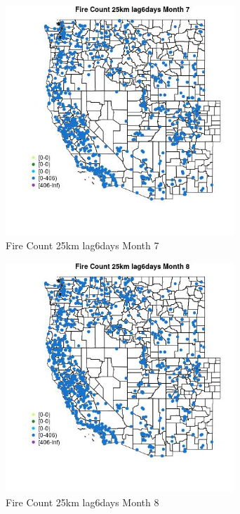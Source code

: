 \begin{figure} 
\centering  
\includegraphics[width=0.77\textwidth]{Code_Outputs/Report_ML_input_PM25_Step4_part_f_de_duplicated_aveswNAs_MapObsMo7Fire_Count_25km_lag6days.jpg} 
\caption{\label{fig:Report_ML_input_PM25_Step4_part_f_de_duplicated_aveswNAsMapObsMo7Fire_Count_25km_lag6days}Fire Count 25km lag6days Month 7} 
\end{figure} 
 

\begin{figure} 
\centering  
\includegraphics[width=0.77\textwidth]{Code_Outputs/Report_ML_input_PM25_Step4_part_f_de_duplicated_aveswNAs_MapObsMo8Fire_Count_25km_lag6days.jpg} 
\caption{\label{fig:Report_ML_input_PM25_Step4_part_f_de_duplicated_aveswNAsMapObsMo8Fire_Count_25km_lag6days}Fire Count 25km lag6days Month 8} 
\end{figure} 
 

